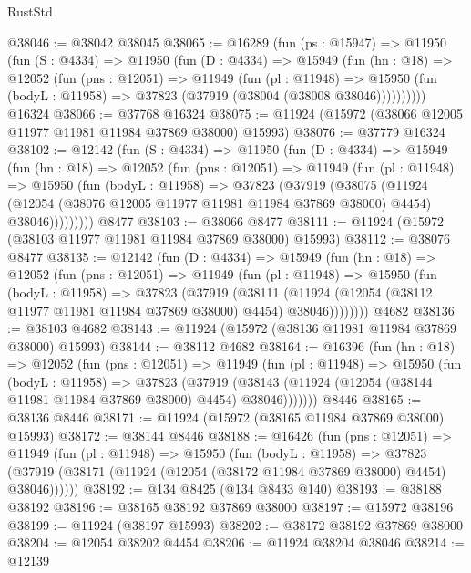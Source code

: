 \begin{lexlean}{RustStd}
\begin{coremodule}
{\begin{coremodule}
{{{{{{{{{{{{{{{{{{{{{{{{{{{{{{{{{{{{{{{{{{{{{{{{{{{{{{{{{{{{{{{{{{{{{{{{{{{{{{{{@38046 := @38042 @38045
@38065 := @16289
    (fun (ps : @15947) =>
    @11950
      (fun (S : @4334) =>
      @11950
        (fun (D : @4334) =>
        @15949
          (fun (hn : @18) =>
          @12052
            (fun (pns : @12051) =>
            @11949
              (fun (pl : @11948) =>
              @15950 (fun (bodyL : @11958) => @37823 (@37919 (@38004 (@38008 @38046))))))))))
    @16324
@38066 := @37768 @16324
@38075 := @11924 (@15972 (@38066 @12005 @11977 @11981 @11984 @37869 @38000) @15993)
@38076 := @37779 @16324
@38102 := @12142
    (fun (S : @4334) =>
    @11950
      (fun (D : @4334) =>
      @15949
        (fun (hn : @18) =>
        @12052
          (fun (pns : @12051) =>
          @11949
            (fun (pl : @11948) =>
            @15950
              (fun (bodyL : @11958) =>
              @37823
                (@37919
                  (@38075
                    (@11924
                      (@12054 (@38076 @12005 @11977 @11981 @11984 @37869 @38000) @4454)
                      @38046)))))))))
    @8477
@38103 := @38066 @8477
@38111 := @11924 (@15972 (@38103 @11977 @11981 @11984 @37869 @38000) @15993)
@38112 := @38076 @8477
@38135 := @12142
    (fun (D : @4334) =>
    @15949
      (fun (hn : @18) =>
      @12052
        (fun (pns : @12051) =>
        @11949
          (fun (pl : @11948) =>
          @15950
            (fun (bodyL : @11958) =>
            @37823
              (@37919
                (@38111
                  (@11924 (@12054 (@38112 @11977 @11981 @11984 @37869 @38000) @4454) @38046))))))))
    @4682
@38136 := @38103 @4682
@38143 := @11924 (@15972 (@38136 @11981 @11984 @37869 @38000) @15993)
@38144 := @38112 @4682
@38164 := @16396
    (fun (hn : @18) =>
    @12052
      (fun (pns : @12051) =>
      @11949
        (fun (pl : @11948) =>
        @15950
          (fun (bodyL : @11958) =>
          @37823
            (@37919
              (@38143 (@11924 (@12054 (@38144 @11981 @11984 @37869 @38000) @4454) @38046)))))))
    @8446
@38165 := @38136 @8446
@38171 := @11924 (@15972 (@38165 @11984 @37869 @38000) @15993)
@38172 := @38144 @8446
@38188 := @16426
    (fun (pns : @12051) =>
    @11949
      (fun (pl : @11948) =>
      @15950
        (fun (bodyL : @11958) =>
        @37823 (@37919 (@38171 (@11924 (@12054 (@38172 @11984 @37869 @38000) @4454) @38046))))))
@38192 := @134 @8425 (@134 @8433 @140)
@38193 := @38188 @38192
@38196 := @38165 @38192 @37869 @38000
@38197 := @15972 @38196
@38199 := @11924 (@38197 @15993)
@38202 := @38172 @38192 @37869 @38000
@38204 := @12054 @38202 @4454
@38206 := @11924 @38204 @38046
@38214 := @12139
}}}}}}}}}}}}}}}}}}}}}}}}}}}}}}}}}}}}}}}}}}}}}}}}}}}}}}}}}}}}}}}}}}}}}}}}}}}}}}}}
\end{coremodule}}
\end{coremodule}
\end{lexlean}
